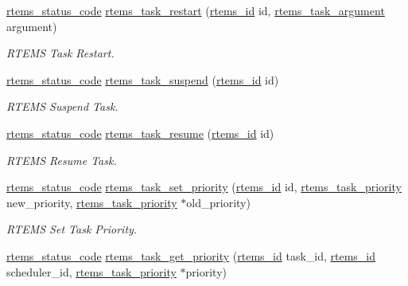 \begin{DoxyCompactItemize}
\mbox{\hyperlink{group__ClassicStatus_ga545d41846817eaba6143d52ee4d9e9fe}{rtems\+\_\+status\+\_\+code}} \mbox{\hyperlink{group__ClassicTasks_ga504b10074964c789ea82fbae8771e074}{rtems\+\_\+task\+\_\+restart}} (\mbox{\hyperlink{group__ClassicTasks_gab20892b814dced7dd4e5b9bf42becd57}{rtems\+\_\+id}} id, \mbox{\hyperlink{group__ClassicTasks_gaf202f985ef5a3156f29eae99a0536842}{rtems\+\_\+task\+\_\+argument}} argument)
\begin{DoxyCompactList}\small\item\em R\+T\+E\+MS Task Restart. \end{DoxyCompactList}\item 
\mbox{\hyperlink{group__ClassicStatus_ga545d41846817eaba6143d52ee4d9e9fe}{rtems\+\_\+status\+\_\+code}} \mbox{\hyperlink{group__ClassicTasks_ga16aca2f5aa37d9d2b2a1a54de0f63dbf}{rtems\+\_\+task\+\_\+suspend}} (\mbox{\hyperlink{group__ClassicTasks_gab20892b814dced7dd4e5b9bf42becd57}{rtems\+\_\+id}} id)
\begin{DoxyCompactList}\small\item\em R\+T\+E\+MS Suspend Task. \end{DoxyCompactList}\item 
\mbox{\hyperlink{group__ClassicStatus_ga545d41846817eaba6143d52ee4d9e9fe}{rtems\+\_\+status\+\_\+code}} \mbox{\hyperlink{group__ClassicTasks_ga5b5778a2be36d41764e730377ccc58a5}{rtems\+\_\+task\+\_\+resume}} (\mbox{\hyperlink{group__ClassicTasks_gab20892b814dced7dd4e5b9bf42becd57}{rtems\+\_\+id}} id)
\begin{DoxyCompactList}\small\item\em R\+T\+E\+MS Resume Task. \end{DoxyCompactList}\item 
\mbox{\hyperlink{group__ClassicStatus_ga545d41846817eaba6143d52ee4d9e9fe}{rtems\+\_\+status\+\_\+code}} \mbox{\hyperlink{group__ClassicTasks_gaeff43063975950a2436c0fddf96f9b33}{rtems\+\_\+task\+\_\+set\+\_\+priority}} (\mbox{\hyperlink{group__ClassicTasks_gab20892b814dced7dd4e5b9bf42becd57}{rtems\+\_\+id}} id, \mbox{\hyperlink{group__ClassicTasks_gaa80a0c0938307d1e99d0eb5fee765b47}{rtems\+\_\+task\+\_\+priority}} new\+\_\+priority, \mbox{\hyperlink{group__ClassicTasks_gaa80a0c0938307d1e99d0eb5fee765b47}{rtems\+\_\+task\+\_\+priority}} $\ast$old\+\_\+priority)
\begin{DoxyCompactList}\small\item\em R\+T\+E\+MS Set Task Priority. \end{DoxyCompactList}\item 
\mbox{\hyperlink{group__ClassicStatus_ga545d41846817eaba6143d52ee4d9e9fe}{rtems\+\_\+status\+\_\+code}} \mbox{\hyperlink{group__ClassicTasks_gad06646a724fbaf16f1a4d117d1c667dc}{rtems\+\_\+task\+\_\+get\+\_\+priority}} (\mbox{\hyperlink{group__ClassicTasks_gab20892b814dced7dd4e5b9bf42becd57}{rtems\+\_\+id}} task\+\_\+id, \mbox{\hyperlink{group__ClassicTasks_gab20892b814dced7dd4e5b9bf42becd57}{rtems\+\_\+id}} scheduler\+\_\+id, \mbox{\hyperlink{group__ClassicTasks_gaa80a0c0938307d1e99d0eb5fee765b47}{rtems\+\_\+task\+\_\+priority}} $\ast$priority)

\end{DoxyCompactItemize}
